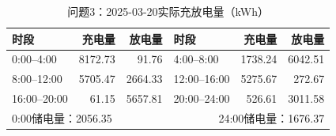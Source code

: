 \begin{table}[H]\centering\small
\caption{问题3：2025-03-20实际充放电量（kWh）}
\label{tab:q3_0320_storage}
\begin{tabular}{lrrlrr}\toprule
时段 & 充电量 & 放电量 & 时段 & 充电量 & 放电量\\\midrule
0:00--4:00 & 8172.73 & 91.76 & 4:00--8:00 & 1738.24 & 6042.51 \\
8:00--12:00 & 5705.47 & 2664.33 & 12:00--16:00 & 5275.67 & 272.67 \\
16:00--20:00 & 61.15 & 5657.81 & 20:00--24:00 & 526.61 & 3011.58 \\
\midrule\multicolumn{3}{l}{0:00储电量：2056.35} & \multicolumn{3}{r}{24:00储电量：1676.37}\\
\bottomrule\end{tabular}\end{table}
